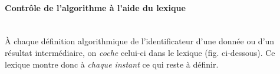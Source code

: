  \paragraph{Contr\^ole de l'algorithme \`a l'aide du lexique}~\\
  \`A chaque d\'efinition algorithmique de l'identificateur d'une donn\'ee ou
  d'un r\'esultat interm\'ediaire, on {\em coche} celui-ci dans le
  lexique (fig. ci-dessous).  Ce lexique montre donc \`a {\em chaque
  instant} ce qui reste \`a d\'efinir.

    \begin{figurette}
    
    \end{figurette}
